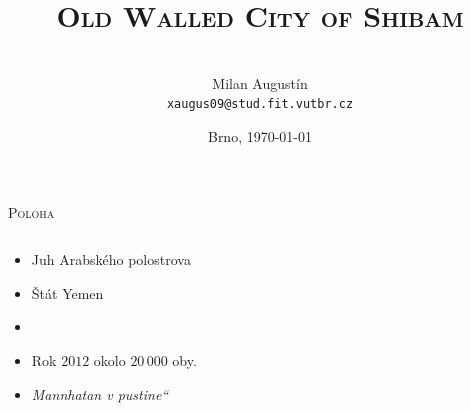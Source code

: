 \documentclass[xcolor=dvipsnames]{beamer}
\newcommand{\myuv}[1]{\quotedblbase #1\textquotedblleft}
\begin{document}
	\title{\textsc{\huge{Old Walled City of Shibam}}}
	\author{\bigskip \\{Milan Augustín}\\[2mm]{\texttt{\scriptsize xaugus09@stud.fit.vutbr.cz}}}
	\date{\scriptsize{Brno, \today}}
	\maketitle

\begin{frame}{\textsc{Poloha}}
\transwipe
\begin{columns}
	\begin{column}{0.5\textwidth}
		\begin{itemize}
		\item Juh Arabského polostrova
		\item Štát Yemen
		\item[]
		\item Rok $2012$ okolo $20\,000$ oby.
		\item \emph{\myuv{Mannhatan v pustine}}
		\end{itemize}
		\vspace{1cm}
	\end{column}
	\begin{column}{0.5\textwidth}
		\begin{figure}[ht]
			\begin{center}
			\end{center}
		\end{figure}
		\vspace{1cm}
	\end{column}
	\end{columns}
\end{frame}
\end{document}
